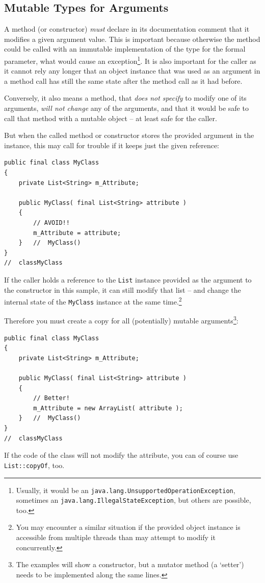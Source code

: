 \documentclass[11pt,a4paper, titlepage, parskip=half, headsepline, footsepline, cleardoublepage=current, headheight=1cm]{scrbook}
\begin{document}
\subsection{Mutable Types for Arguments}\label{sec:MutableTypesForArguments}
A method (or constructor) \textit{must} declare in its documentation comment that it modifies a given argument value. This is important because otherwise the method could be called with an immutable implementation of the type for the formal parameter, what would cause an exception\footnote{Usually, it would be an \lstinline|java.lang.UnsupportedOperationException|\autocite{ORACLE_DOC_UNSUPPORTEDOPERATIONEXCEPTION_CLASS}, sometimes an \lstinline|java.lang.IllegalStateException|\autocite{ORACLE_DOC_ILLEGALSTATEEXCEPTION_CLASS}, but others are possible, too.}. It is also important for the caller as it cannot rely any longer that an object instance that was used as an argument in a method call has still the same state after the method call as it had before.

Conversely, it also means a method, that \textit{does not specify} to modify one of its arguments, \textit{will not change} any of the arguments, and that it would be safe to call that method with a mutable object – at least safe for the caller.

But when the called method or constructor stores the provided argument in the instance, this may call for trouble if it keeps just the given reference:
\begin{lstlisting}
public final class MyClass
{
    private List<String> m_Attribute;
    
    public MyClass( final List<String> attribute )
    {
        // AVOID!!
        m_Attribute = attribute;
    }   //  MyClass()
}
//  classMyClass
\end{lstlisting}

If the caller holds a reference to the \lstinline|List| instance provided as the argument to the constructor in this sample, it can still modify that list – and change the internal state of the \lstinline|MyClass| instance at the same time.\footnote{You may encounter a similar situation if the provided object instance is accessible from multiple threads than may attempt to modify it concurrently.}

Therefore you must create a copy for all (potentially) mutable arguments\footnote{The examples will show a constructor, but a mutator method (a ‘setter’) needs to be implemented along the same lines.}:
\begin{lstlisting}
public final class MyClass
{
    private List<String> m_Attribute;
    
    public MyClass( final List<String> attribute )
    {
    	// Better!
        m_Attribute = new ArrayList( attribute );
    }   //  MyClass()
}
//  classMyClass
\end{lstlisting}
If the code of the class will not modify the attribute, you can of course use \lstinline|List::copyOf|\autocite{ORACLE_DOC_LIST:copyOf}, too.
\end{document}
